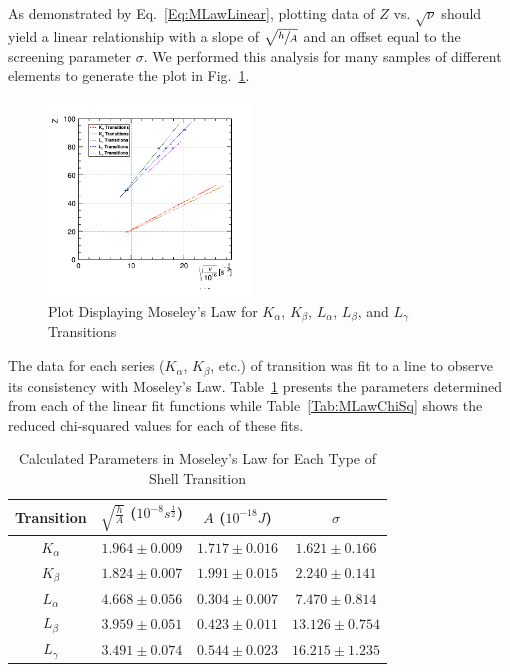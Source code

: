 \documentclass[%
 reprint,
 amsmath,amssymb,
 aps,
 pra,
]{revtex4-1}
\begin{document}
As demonstrated by Eq.~\ref{Eq:MLawLinear}, plotting data of $Z$ vs. $\sqrt{\nu}$ should yield a linear relationship with a slope of $\sqrt{\sfrac{h}{A}}$ and an offset equal to the screening parameter $\sigma$. We performed this analysis for many samples of different elements to generate the plot in Fig.~\ref{Fig:MLawPlot}.
\begin{figure}[H]
	\centering
	\includegraphics[width=0.48\textwidth]{MoseleyLawPlot.png}
	\caption{Plot Displaying Moseley's Law for $K_{\alpha}$, $K_{\beta}$, $L_{\alpha}$, $L_{\beta}$, and $L_{\gamma}$ Transitions}
	\label{Fig:MLawPlot}
\end{figure} 

The data for each series ($K_{\alpha}$, $K_{\beta}$, etc.) of transition was fit to a line to observe its consistency with Moseley's Law. Table~\ref{Tab:MLawData} presents the parameters determined from each of the linear fit functions while Table~\ref{Tab:MLawChiSq} shows the reduced chi-squared values for each of these fits.
\begin{table}[htbp]
	\begin{center}
		\begin{tabular}{|c|c|c|c|}
			\hline Transition & $\sqrt{\frac{h}{A}}$ ($ 10^{-8} s^{\frac{1}{2}}$)  & $A$ ($10^{-18} J$) & $\sigma$ \\
			\hline $K_{\alpha}$ & $1.964 \pm 0.009$ & $1.717 \pm 0.016$ & $1.621 \pm 0.166$ \\
			\hline $K_{\beta}$ & $1.824 \pm 0.007$ & $1.991 \pm 0.015$ & $2.240 \pm 0.141$ \\
			\hline $L_{\alpha}$ & $4.668 \pm 0.056$ & $0.304 \pm 0.007$ & $7.470 \pm 0.814$ \\
			\hline $L_{\beta}$ & $3.959 \pm 0.051$ & $0.423 \pm 0.011$ & $13.126 \pm 0.754$ \\
			\hline $L_{\gamma}$ & $3.491 \pm 0.074$ & $0.544 \pm 0.023$ & $16.215 \pm 1.235$ \\
			\hline
		\end{tabular}
	\end{center}
	\caption{Calculated Parameters in Moseley's Law for Each Type of Shell Transition}
	\label{Tab:MLawData}
\end{table}
\end{document}
